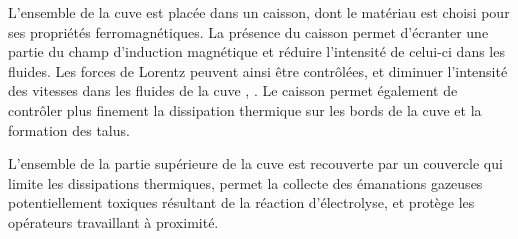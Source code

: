 L'ensemble de la cuve est placée dans un caisson, dont le matériau est
choisi pour ses propriétés ferromagnétiques. La présence du caisson
permet d'écranter une partie du champ d'induction magnétique et
réduire l'intensité de celui-ci dans les fluides. Les forces de
Lorentz peuvent ainsi être contrôlées, et diminuer l'intensité des
vitesses dans les fluides de la cuve \cite{Descloux1},
\cite{Descloux2}.  Le caisson permet également de contrôler plus
finement la dissipation thermique sur les bords de la cuve et la
formation des talus.

L'ensemble de la partie supérieure de la cuve est recouverte par un
couvercle qui limite les dissipations thermiques, permet la collecte
des émanations gazeuses potentiellement toxiques résultant de la
réaction d'électrolyse, et protège les opérateurs travaillant à
proximité.
